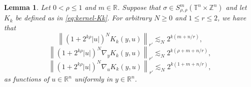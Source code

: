 \documentclass[12pt, reqno]{amsart}
\newtheorem{lemma}[theorem]{Lemma}
\theoremstyle{definition}
\theoremstyle{remark}
\numberwithin{equation}{section}
\begin{document}
\begin{lemma}
    Let $0 < \rho \leq 1$ and $m\in \mathbb{R}$. Suppose that $\sigma \in S^m_{\rho,\rho}(\mathbb{T}^n \times \mathbb{Z}^n) $ and let $K_k$ be defined as in \cref{eq:kernel-Kk}. For arbitrary $N\geq 0$ and $1\leq r\leq 2$, we have that 
    \begin{equation*}
        \left\| (1+2^{k\rho}|u|)^N K_k(y, u)
        \right\|_{r'} \lesssim_N 2^{k(m+n/r)},
    \end{equation*}
    \begin{equation*}
        \left\| (1+2^{k\rho}|u|)^N \nabla_y K_k(y, u)
        \right\|_{r'} \lesssim_N 2^{k(\rho+m+n/r)},
    \end{equation*}
    \begin{equation*}
        \left\| (1+2^{k\rho}|u|)^N \nabla_u K_k(y, u)
        \right\|_{r'} \lesssim_N 2^{k(1+m+n/r)},
    \end{equation*}
    as functions of $u\in\mathbb{R}^n$ uniformly in $y\in\mathbb{R}^n$.
    \label{lem:kernel-estimates}
\end{lemma}
\end{document}
